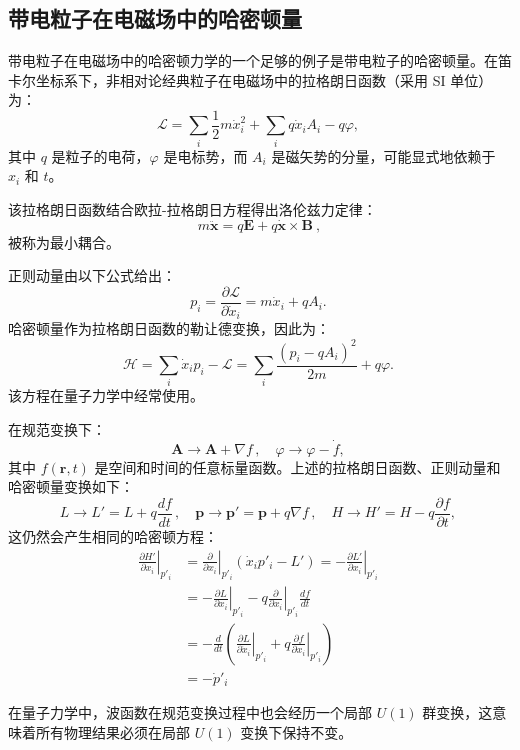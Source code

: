 \subsection{带电粒子在电磁场中的哈密顿量}
带电粒子在电磁场中的哈密顿力学的一个足够的例子是带电粒子的哈密顿量。在笛卡尔坐标系下，非相对论经典粒子在电磁场中的拉格朗日函数（采用 SI 单位）为：
\[
\mathcal{L} = \sum_{i} \frac{1}{2} m \dot{x}_i^2 + \sum_{i} q \dot{x}_i A_i - q \varphi,~
\]
其中 \( q \) 是粒子的电荷，\( \varphi \) 是电标势，而 \( A_i \) 是磁矢势的分量，可能显式地依赖于 \( x_i \) 和 \( t \)。

该拉格朗日函数结合欧拉-拉格朗日方程得出洛伦兹力定律：
\[
m \ddot{\mathbf{x}} = q \mathbf{E} + q \dot{\mathbf{x}} \times \mathbf{B} ~,
\]
被称为最小耦合。

正则动量由以下公式给出：
\[
p_i = \frac{\partial \mathcal{L}}{\partial \dot{x}_i} = m \dot{x}_i + q A_i.~
\]
哈密顿量作为拉格朗日函数的勒让德变换，因此为：
\[
\mathcal{H} = \sum_{i} \dot{x}_i p_i - \mathcal{L} = \sum_{i} \frac{\left( p_i - q A_i \right)^2}{2m} + q \varphi.~
\]
该方程在量子力学中经常使用。

在规范变换下：
\[
\mathbf{A} \rightarrow \mathbf{A} + \nabla f \,, \quad \varphi \rightarrow \varphi - \dot{f},~
\]
其中 \( f(\mathbf{r}, t) \) 是空间和时间的任意标量函数。上述的拉格朗日函数、正则动量和哈密顿量变换如下：
\[
L \rightarrow L' = L + q \frac{df}{dt} \,, \quad \mathbf{p} \rightarrow \mathbf{p}' = \mathbf{p} + q \nabla f \,, \quad H \rightarrow H' = H - q \frac{\partial f}{\partial t} ,~
\]
这仍然会产生相同的哈密顿方程：
\begin{equation}
\begin{aligned}
\left. \frac{\partial H'}{\partial {x_i}} \right|_{p'_i} &= \left. \frac{\partial}{\partial {x_i}} \right|_{p'_i} ({\dot{x}}_i p'_i - L') = - \left. \frac{\partial L'}{\partial {x_i}} \right|_{p'_i}\\
&= - \left. \frac{\partial L}{\partial {x_i}} \right|_{p'_i} - q \left. \frac{\partial}{\partial {x_i}} \right|_{p'_i} \frac{df}{dt} \\
&= - \frac{d}{dt} \left( \left. \frac{\partial L}{\partial {\dot{x}_i}} \right|_{p'_i} + q \left. \frac{\partial f}{\partial {x_i}} \right|_{p'_i} \right)\\ 
&= - \dot{p}'_i
\end{aligned}~
\end{equation} 

在量子力学中，波函数在规范变换过程中也会经历一个局部 \( U(1) \) 群变换，这意味着所有物理结果必须在局部 \( U(1) \) 变换下保持不变。 
